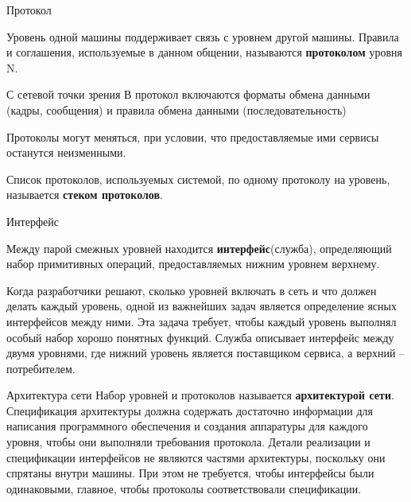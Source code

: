 \begin{frame}{Протокол}
	\begin{center}
Уровень одной машины поддерживает связь с уровнем другой машины. 
Правила и соглашения, используемые в данном общении,  называются {\bfseries протоколом} уровня N.
	\end{center}
	\begin{center}
С сетевой точки зрения В протокол включаются форматы обмена данными (кадры,  сообщения) и правила обмена данными (последовательность)
	\end{center}
	\begin{center}
Протоколы могут меняться,  при условии,  что предоставляемые ими сервисы останутся неизменными.
	\end{center}
	\begin{center}
		Список протоколов,  используемых системой,  по одному протоколу на уровень,  называется {\bfseries стеком протоколов}.
	\end{center}
\end{frame}

\begin{frame}{Интерфейс}
	\begin{center}
		Между парой смежных уровней находится {\bfseries интерфейс}(служба),  определяющий набор примитивных операций,  предоставляемых нижним уровнем верхнему.
	\end{center}
	\begin{center}
	Когда разработчики решают,  сколько уровней включать в сеть и что должен делать каждый уровень,  одной из важнейших задач является определение ясных интерфейсов между ними. Эта задача требует,  чтобы каждый уровень выполнял особый набор хорошо понятных функций. Служба описывает интерфейс между двумя уровнями, где нижний уровень является поставщиком сервиса, а верхний – потребителем.
	\end{center}
\end{frame}

\begin{frame}{Архитектура сети}
	Набор уровней и протоколов называется {\bfseries архитектурой сети}.
	Спецификация архитектуры должна содержать достаточно информации для написания программного обеспечения и создания аппаратуры для каждого уровня,  чтобы они выполняли требования протокола. Детали реализации и спецификации интерфейсов не являются частями архитектуры,  поскольку они спрятаны внутри машины. При этом не требуется,  чтобы интерфейсы были одинаковыми,  главное,  чтобы протоколы соответствовали спецификации.
\end{frame}

